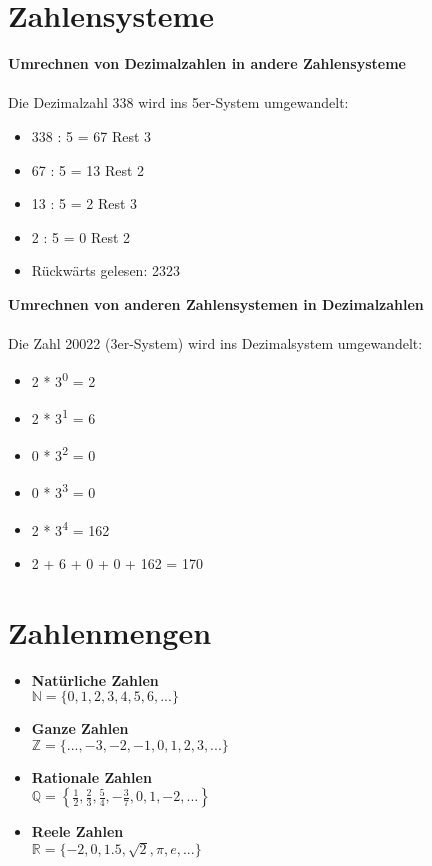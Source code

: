 \section{Zahlensysteme}

\textbf{Umrechnen von Dezimalzahlen in andere Zahlensysteme}\\\\
Die Dezimalzahl 338 wird ins 5er-System umgewandelt:
\begin{itemize}
    \item 338 : 5 = 67 Rest 3
    \item 67 : 5 = 13 Rest 2
    \item 13 : 5 = 2 Rest 3
    \item 2 : 5 = 0 Rest 2
    \item Rückwärts gelesen: 2323
\end{itemize}
\bigskip
\textbf{Umrechnen von anderen Zahlensystemen in Dezimalzahlen}\\\\
Die Zahl 20022 (3er-System) wird ins Dezimalsystem umgewandelt:
\begin{itemize}
    \item 2 * 3\textsuperscript{0} = 2
    \item 2 * 3\textsuperscript{1} = 6
    \item 0 * 3\textsuperscript{2} = 0
    \item 0 * 3\textsuperscript{3} = 0
    \item 2 * 3\textsuperscript{4} = 162
    \item 2 + 6 + 0 + 0 + 162 = 170
\end{itemize}
\section{Zahlenmengen}

\begin{itemize}
    \item {\bf Natürliche Zahlen}\\
    \(\mathbb{N} = \{0,1,2,3,4,5,6,...\}\)
    \item {\bf Ganze Zahlen}\\
    \(\mathbb{Z} = \{...,-3,-2,-1,0,1,2,3,...\}\)
    \item {\bf Rationale Zahlen}\\
    \(\mathbb{Q} = \left\{ \frac{1}{2}, \frac{2}{3}, \frac{5}{4}, -\frac{3}{7}, 0, 1, -2, ... \right\}\)
    \item {\bf Reele Zahlen}\\
    \(\mathbb{R} = \{ -2, 0, 1.5, \sqrt{2}, \pi, e, ... \}\)
\end{itemize}

